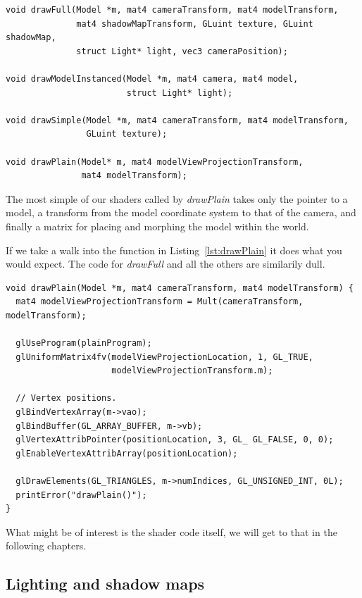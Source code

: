 \documentclass[a4paper,12pt]{article}
\begin{document}
\begin{lstlisting}[label=lst:entry-points,caption= The entry points of each shader pair\, listed in decreasing complexity.]
void drawFull(Model *m, mat4 cameraTransform, mat4 modelTransform,
              mat4 shadowMapTransform, GLuint texture, GLuint shadowMap,
              struct Light* light, vec3 cameraPosition);

void drawModelInstanced(Model *m, mat4 camera, mat4 model,
                        struct Light* light);

void drawSimple(Model *m, mat4 cameraTransform, mat4 modelTransform,
                GLuint texture);

void drawPlain(Model* m, mat4 modelViewProjectionTransform,
               mat4 modelTransform);
\end{lstlisting}

The most simple of our shaders called by \emph{drawPlain} takes only the pointer to a model, a transform from the model coordinate system to that of the camera, and finally a matrix for placing and morphing the model within the world.

If we take a walk into the function in Listing~\ref{lst:drawPlain} it does what you would expect. The code for \emph{drawFull} and all the others are similarily dull.

\begin{lstlisting}[label=lst:drawPlain,caption= The contents of the drawPlain function.]
void drawPlain(Model *m, mat4 cameraTransform, mat4 modelTransform) {
  mat4 modelViewProjectionTransform = Mult(cameraTransform, modelTransform);

  glUseProgram(plainProgram);
  glUniformMatrix4fv(modelViewProjectionLocation, 1, GL_TRUE,
                     modelViewProjectionTransform.m);

  // Vertex positions.
  glBindVertexArray(m->vao);
  glBindBuffer(GL_ARRAY_BUFFER, m->vb);
  glVertexAttribPointer(positionLocation, 3, GL_ GL_FALSE, 0, 0);
  glEnableVertexAttribArray(positionLocation);

  glDrawElements(GL_TRIANGLES, m->numIndices, GL_UNSIGNED_INT, 0L);
  printError("drawPlain()");
}
\end{lstlisting}

What might be of interest is the shader code itself, we will get to that in the following chapters.


\subsection{Lighting and shadow maps}
\end{document}

